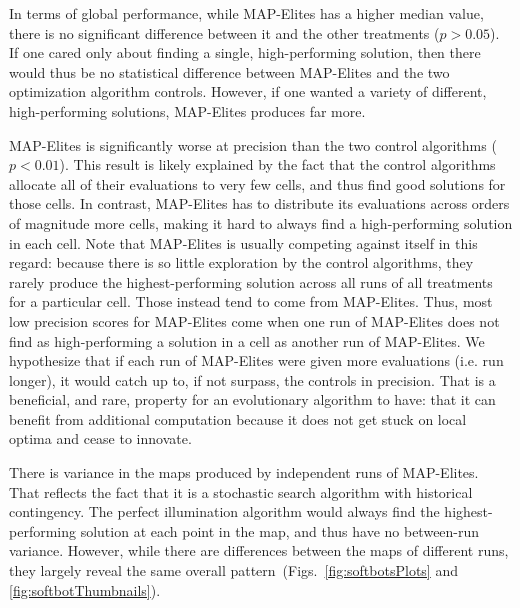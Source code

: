 \documentclass[twocolumn, DIV25, 9pt]{scrartcl}
\newcommand{\todoOfficialVersion}[1]{} %
\begin{document}
In terms of global performance, while MAP-Elites has a higher median value, there is no significant difference between it and the other treatments ($p > 0.05$). If one cared only about finding a single, high-performing solution, then there would thus be no statistical difference between MAP-Elites and the two optimization algorithm controls. However, if one wanted a variety of different, high-performing solutions, MAP-Elites produces far more.   

MAP-Elites is significantly worse at precision than the two control algorithms ($p<0.01$). This result is likely explained by the fact that the control algorithms allocate all of their evaluations to very few cells, and thus find good solutions for those cells. In contrast, MAP-Elites has to distribute its evaluations across orders of magnitude more cells, making it hard to always find a high-performing solution in each cell. Note that MAP-Elites is usually competing against itself in this regard: because there is so little exploration by the control algorithms, they rarely produce the highest-performing solution across all runs of all treatments for a particular cell. Those instead tend to come from MAP-Elites.\todoOfficialVersion{This could be another measure: who produces the best ever for each cell} Thus, most low precision scores for MAP-Elites come when one run of MAP-Elites does not find as high-performing a solution in a cell as another run of MAP-Elites. We hypothesize that if each run of MAP-Elites were given more evaluations (i.e. run longer), it would catch up to, if not surpass, the controls in precision. That is a beneficial, and rare, property for an evolutionary algorithm to have: that it can benefit from additional computation because it does not get stuck on local optima and cease to innovate. 

There is variance in the maps produced by independent runs of MAP-Elites. That reflects the fact that it is a stochastic search algorithm with historical contingency. The perfect illumination algorithm would always find the highest-performing solution at each point in the map, and thus have no between-run variance. However, while there are differences between the maps of different runs, they largely reveal the same overall pattern~(Figs.~\ref{fig:softbotsPlots} and \ref{fig:softbotThumbnails}).
\end{document}
